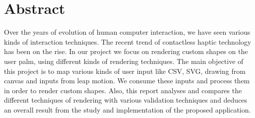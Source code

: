 %
\chapter*{Abstract}
\label{sec:abstract}
\vspace*{-10mm}
Over the years of evolution of human computer interaction, we have seen various kinds of interaction techniques. The recent trend of contactless haptic technology has been on the rise. In our project we focus on rendering custom shapes on the user palm, using different kinds of rendering techniques. The main objective of this project is to map various kinds of user input like CSV, SVG, drawing from canvas and inputs from leap motion. We consume these inputs and process them in order to render custom shapes. Also, this report analyses and compares the different techniques of rendering with various validation techniques and deduces an overall result from the study and implementation of the proposed application.



